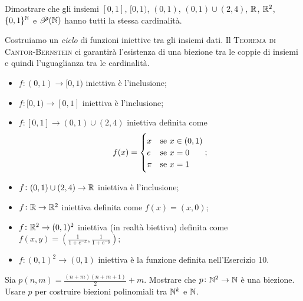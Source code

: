 \begin{es}
  Dimostrare che gli insiemi $ [0, 1] $, $ [0, 1) $, $ (0, 1) $, $ (0, 1) \cup (2, 4) $, $ \mathbb{R} $, $ \mathbb{R}^2 $, $ \{0, 1\}^{\mathbb{N}} $ e $ \mathscr{P}(\mathbb{N}) $ hanno tutti la stessa cardinalità.
\end{es}

Costruiamo un \emph{ciclo} di funzioni iniettive tra gli insiemi dati. Il \textsc{Teorema di Cantor-Bernstein} ci garantirà l'esistenza di una biezione tra le coppie di insiemi e quindi l'uguaglianza tra le cardinalità.
\begin{itemize}
\item $ f \colon (0, 1) \to [0, 1) $ iniettiva è l'inclusione;
\item $ f \colon [0, 1) \to [0, 1] $ iniettiva è l'inclusione;
\item $ f \colon [0, 1] \to (0, 1) \cup (2, 4) $ iniettiva definita come
  \[f(x) =
    \begin{cases}
      x & \text{se $ x \in (0, 1) $} \\
      e & \text{se $ x = 0 $} \\
      \pi & \text{se $ x = 1 $} \\
    \end{cases};\]
\item $ f \colon (0, 1) \cup (2, 4) \to \mathbb{R} $ iniettiva è l'inclusione;
\item $ f \colon \mathbb{R} \to \mathbb{R}^2 $ iniettiva definita come $ f(x) = (x, 0) $;
\item $ f \colon \mathbb{R}^2 \to (0, 1)^2 $ iniettiva (in realtà biettiva) definita come $ f(x, y) = \left(\frac{1}{1 + e^{-x}}, \frac{1}{1 + e^{-y}}\right) $;
\item $ f \colon (0, 1)^2 \to (0, 1) $ iniettiva è la funzione definita nell'Esercizio 10.
\end{itemize}

\begin{es}
  Sia $ p(n, m) = \frac{(n + m)(n + m + 1)}{2} + m $. Mostrare che $ p \colon \mathbb{N}^2 \to \mathbb{N} $ è una biezione. Usare $ p $ per costruire biezioni polinomiali tra $ \mathbb{N}^k $ e $ \mathbb{N} $.
\end{es}

